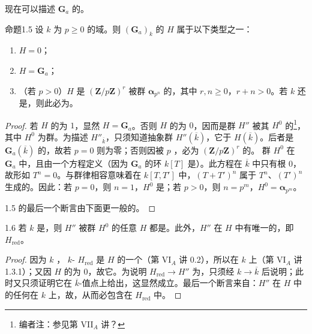 现在可以描述 $\mathbf G_a$ 的。
\begin{SGAresult}{命题}{1.5}
设 $k$ 为 $p\geq0$ 的域。则 $(\mathbf G_a)_k$ 的 $H$ 属于以下类型之一：
\begin{enumerate}
\item[(i)] $H=0$；
\item[(ii)] $H=\mathbf G_a$；
\item[(iii)] （若 $p>0$）$H$ 是 $(\mathbf Z/p\mathbf Z)^r$ 被群 $\boldsymbol\alpha_{p^n}$ 的，其中 $r,n\geq0$，$r+n>0$。若 $k$ 还是，则此必为。
\end{enumerate}
\end{SGAresult}
\begin{proof}
若 $H$ 的为 $1$，显然 $H=\mathbf G_a$。否则 $H$ 的为 $0$，因而是群 $H''$ 被其 $H^0$ 的\footnote{编者注：参见第 VII$_A$ 讲？}，其中 $H^0$ 为群。为描述 $H''_{\overline k}$，只须知道抽象群 $H''(\overline k)$，它于 $H(\overline k)$。后者是 $\mathbf G_a(\overline k)$ 的，故若 $p=0$ 则为零；否则因被 $p$ ，必为 $(\mathbf Z/p\mathbf Z)^r$ 的。
群 $H^0$ 在 $\mathbf G_a$ 中，且由一个方程定义（因为 $\mathbf G_a$ 的环 $k[T]$ 是）。此方程在 $\overline k$ 中只有根 $0$，故形如 $T^n=0$。与群律相容意味着在 $k[T,T']$ 中，$(T+T')^n$ 属于 $T^n$、$(T')^n$ 生成的。因此：若 $p=0$，则 $n=1$，$H^0$ 是；若 $p>0$，则 $n=p^m$，$H^0=\boldsymbol\alpha_{p^m}$。

1.5 的最后一个断言由下面更一般的。
\end{proof}
\begin{SGAresult}{}{1.6}
若 $k$ 是，则 $H''$ 被群 $H^0$ 的任意 $H$ 都是。此外，$H''$ 在 $H$ 中有唯一的，即 $H_{\mathrm{red}}$。
\end{SGAresult}
\begin{proof}
因为 $k$ ， $k$- $H_{\mathrm{red}}$ 是 $H$ 的一个（第 VI$_A$ 讲 0.2），所以在 $k$ 上（第 VI$_A$ 讲 1.3.1）；又因 $H$ 的为 $0$，故它。为说明 $H_{\mathrm{red}}\to H''$ 为，只须经 $k\to\overline k$ 后说明；此时又只须证明它在 $\overline k$-值点上给出，这显然成立。最后一个断言来自：$H''$ 在 $H$ 中的任何在 $k$ 上，故，从而必包含在 $H_{\mathrm{red}}$ 中。
\end{proof}
